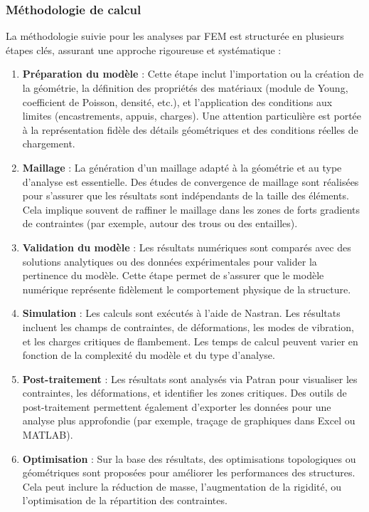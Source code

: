 \subsubsection{Méthodologie de calcul}

La méthodologie suivie pour les analyses par \acrshort{FEM} est structurée en plusieurs 
étapes clés, assurant une approche rigoureuse et systématique :

\begin{enumerate}
    \item \textbf{Préparation du modèle} :
    Cette étape inclut l'importation ou la création de la géométrie, la définition des 
    propriétés des matériaux (module de Young, coefficient de Poisson, densité, etc.), 
    et l'application des conditions aux limites (encastrements, appuis, charges). Une 
    attention particulière est portée à la représentation fidèle des détails géométriques
     et des conditions réelles de chargement.

    \item \textbf{Maillage} :
    La génération d'un maillage adapté à la géométrie et au type d'analyse est 
    essentielle. Des études de convergence de maillage sont réalisées pour s'assurer 
    que les résultats sont indépendants de la taille des éléments. Cela implique souvent 
    de raffiner le maillage dans les zones de forts gradients de contraintes (par 
    exemple, autour des trous ou des entailles).

    \item \textbf{Validation du modèle} :
    Les résultats numériques sont comparés avec des solutions analytiques ou des données
     expérimentales pour valider la pertinence du modèle. Cette étape permet de s'assurer
      que le modèle numérique représente fidèlement le comportement physique de la 
      structure.

    \item \textbf{Simulation} :
    Les calculs sont exécutés à l'aide de Nastran. Les résultats incluent les champs de 
    contraintes, de déformations, les modes de vibration, et les charges critiques de 
    flambement. Les temps de calcul peuvent varier en fonction de la complexité du 
    modèle et du type d'analyse.

    \item \textbf{Post-traitement} :
    Les résultats sont analysés via Patran pour visualiser les contraintes, les 
    déformations, et identifier les zones critiques. Des outils de post-traitement 
    permettent également d'exporter les données pour une analyse plus approfondie 
    (par exemple, traçage de graphiques dans Excel ou MATLAB).

    \item \textbf{Optimisation} :
    Sur la base des résultats, des optimisations topologiques ou géométriques sont 
    proposées pour améliorer les performances des structures. Cela peut inclure la 
    réduction de masse, l'augmentation de la rigidité, ou l'optimisation de la 
    répartition des contraintes.
\end{enumerate}


